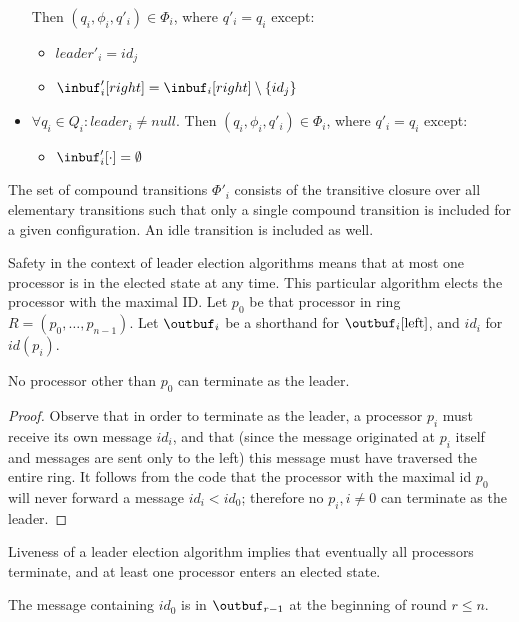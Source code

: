 \begin{itemize}
      Then $(q_i, \phi_i, q'_i) \in \Phi_i$,
      where $q'_i = q_i$ except:
      \begin{itemize}
      \item $leader'_i = id_j$
      \item $\inbuf'_i[right] = \inbuf_i[right] \setminus \{id_j\}$
      \end{itemize}
\item $\forall q_i \in Q_i: leader_i \neq null$.
      Then $(q_i, \phi_i, q'_i) \in \Phi_i$,
      where $q'_i = q_i$ except:
      \begin{itemize}
      \item $\inbuf'_i[\cdot] = \emptyset$
      \end{itemize}
\end{itemize}

The set of compound transitions $\Phi'_i$ consists of the transitive closure over all elementary
transitions such that only a single compound transition is included for a given configuration. An
idle transition is included as well.

Safety in the context of leader election algorithms means that at most one processor is in the
elected state at any time. This particular algorithm elects the processor with the maximal ID.
Let $p_0$ be that processor in ring $R = (p_0, \ldots, p_{n-1})$. Let $\outbuf_i$ be a shorthand for
$\outbuf_i[\text{left}]$, and $id_i$ for $id(p_i)$.

\begin{theorem}
No processor other than $p_0$ can terminate as the leader.
\end{theorem}

\begin{proof}
Observe that in order to terminate as the leader, a processor $p_i$ must receive its own message
$id_i$, and that (since the message originated at $p_i$ itself and messages are sent only to the left)
this message must have traversed the entire ring. It follows from the code that the processor with
the maximal id $p_0$ will never forward a message $id_i < id_0$; therefore no $p_i, i \neq 0$ can
terminate as the leader.
\end{proof}

Liveness of a leader election algorithm implies that eventually all processors terminate, and
at least one processor enters an elected state.

\begin{lemma} \label{lemma:le-liveness}
The message containing $id_0$ is in $\outbuf_{r-1}$ at the beginning of round $r \leq n$.
\end{lemma}

